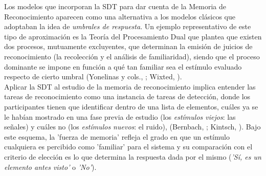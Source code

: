 
Los modelos que incorporan la SDT para dar cuenta de la Memoria de Reconocimiento aparecen como una alternativa a los modelos clásicos que adoptaban la idea de \textit{umbrales de respuesta}. Un ejemplo representativo de este tipo de aproximación es la Teoría del Procesamiento Dual que plantea que existen dos procesos, mutuamente excluyentes, que determinan la emisión de juicios de reconocimiento (la recolección y el análisis de familiaridad), siendo que el proceso dominante se impone en función a qué tan familiar sea el estímulo evaluado respecto de cierto umbral (Yonelinas y cols., \citeyear{Yonelinas1996}; Wixted, \citeyear{Wixted2007}).\\

Aplicar la SDT al estudio de la memoria de reconocimiento implica entender las tareas de reconocimiento como una instancia de tareas de detección, donde los participantes tienen que identificar dentro de una lista de elementos, cuáles ya se le habían mostrado en una fase previa de estudio (los \textit{estímulos viejos}: las señales) y cuáles no (los \textit{estímulos nuevos}: el ruido), (Bernbach, \citeyear{Bernbach1967}; Kintsch, \citeyear{Kintsch1967}). Bajo este esquema, la 'fuerza de memoria' refleja el grado en que un estímulo cualquiera es percibido como 'familiar' para el sistema y su comparación con el criterio de elección es lo que determina la respuesta dada por el mismo (\textit{'Sí, es un elemento antes visto'} o \textit{'No'}).\\ 

